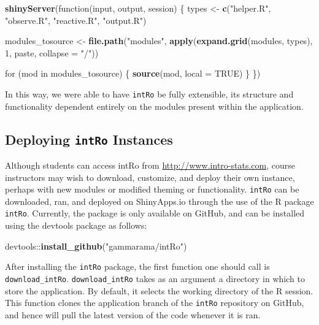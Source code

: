 \documentclass[12pt,]{article}
\newenvironment{Shaded}{\begin{snugshade}}{\end{snugshade}}
\newcommand{\KeywordTok}[1]{\textcolor[rgb]{0.13,0.29,0.53}{\textbf{{#1}}}}
\newcommand{\DataTypeTok}[1]{\textcolor[rgb]{0.13,0.29,0.53}{{#1}}}
\newcommand{\DecValTok}[1]{\textcolor[rgb]{0.00,0.00,0.81}{{#1}}}
\newcommand{\StringTok}[1]{\textcolor[rgb]{0.31,0.60,0.02}{{#1}}}
\newcommand{\OtherTok}[1]{\textcolor[rgb]{0.56,0.35,0.01}{{#1}}}
\newcommand{\NormalTok}[1]{{#1}}
\begin{document}
\begin{Shaded}
\begin{Highlighting}[]
\KeywordTok{shinyServer}\NormalTok{(function(input, output, session) \{}
    \NormalTok{types <-}\StringTok{ }\KeywordTok{c}\NormalTok{(}\StringTok{"helper.R"}\NormalTok{, }\StringTok{"observe.R"}\NormalTok{, }\StringTok{"reactive.R"}\NormalTok{, }
        \StringTok{"output.R"}\NormalTok{)}
    
    \NormalTok{modules_tosource <-}\StringTok{ }\KeywordTok{file.path}\NormalTok{(}\StringTok{"modules"}\NormalTok{, }\KeywordTok{apply}\NormalTok{(}\KeywordTok{expand.grid}\NormalTok{(modules, }
        \NormalTok{types), }\DecValTok{1}\NormalTok{, paste, }\DataTypeTok{collapse =} \StringTok{"/"}\NormalTok{))}
    
    \NormalTok{for (mod in modules_tosource) \{}
        \KeywordTok{source}\NormalTok{(mod, }\DataTypeTok{local =} \OtherTok{TRUE}\NormalTok{)}
    \NormalTok{\}}
\NormalTok{\})}
\end{Highlighting}
\end{Shaded}

\normalsize
In this way, we were able to have \texttt{intRo} be fully extensible,
its structure and functionality dependent entirely on the modules
present within the application.

\subsection{\texorpdfstring{Deploying \texttt{intRo}
Instances}{Deploying intRo Instances}}\label{deploying-intro-instances}

Although students can access intRo from
\url{http://www.intro-stats.com}, course instructors may wish to
download, customize, and deploy their own instance, perhaps with new
modules or modified theming or functionality. \texttt{intRo} can be
downloaded, ran, and deployed on ShinyApps.io through the use of the R
package \texttt{intRo}. Currently, the package is only available on
GitHub, and can be installed using the devtools package as follows:

\begin{Shaded}
\begin{Highlighting}[]
\NormalTok{devtools::}\KeywordTok{install_github}\NormalTok{(}\StringTok{"gammarama/intRo"}\NormalTok{)}
\end{Highlighting}
\end{Shaded}

After installing the \texttt{intRo} package, the first function one
should call is \texttt{download\_intRo}. \texttt{download\_intRo} takes
as an argument a directory in which to store the application. By
default, it selects the working directory of the R session. This
function clones the application branch of the \texttt{intRo} repository
on GitHub, and hence will pull the latest version of the code whenever
it is ran.
\end{document}
